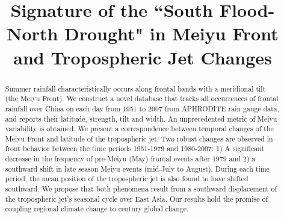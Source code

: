 \documentclass[draft,grl]{AGUTeX}
\begin{document}
%
%


\title{Signature of the ``South Flood-North Drought" in Meiyu Front and Tropospheric Jet Changes}

%
%







%
%


\begin{abstract}
Summer rainfall characteristically occurs along frontal bands with a meridional tilt (the Meiyu Front). We construct a novel database that tracks all occurrences of frontal rainfall over China on each day from 1951 to 2007 from APHRODITE rain gauge data, and reports their latitude, strength, tilt and width. An unprecedented metric of Meiyu variability is obtained. We present a correspondence between temporal changes of the Meiyu Front and latitude of the tropospheric jet. Two robust changes are observed in front behavior between the time periods 1951-1979 and 1980-2007: 1) A significant decrease in the frequency of pre-Meiyu (May) frontal events after 1979 and 2) a southward shift in late season Meiyu events (mid-July to August). During each time period, the mean position of the tropospheric jet is also found to have shifted southward. We propose that both phenomena result from a southward displacement of the tropospheric jet's seasonal cycle over East Asia. Our results hold the promise of coupling regional climate change to  century global change. 

\end{abstract}
\end{document}
